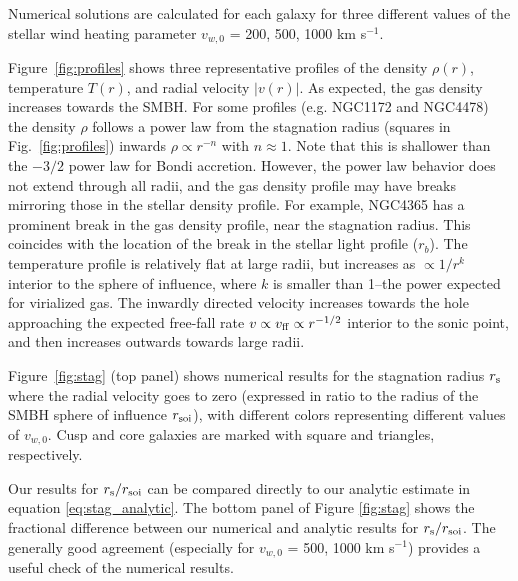 \documentclass[usenatbib,fleqn]{mn2e}
\newcommand{\rb}{r_b}
\begin{document}
Numerical solutions are calculated for each galaxy for three different values of the stellar wind heating parameter $v_{w,0}$ = 200, 500, 1000 km s$^{-1}$.  

Figure~\ref{fig:profiles} shows three representative profiles of the
density $\rho(r)$, temperature $T(r)$, and radial velocity $|v(r)|$.
As expected, the gas density increases towards the SMBH.  For some
profiles (e.g. NGC1172 and NGC4478) the density $\rho$ follows a power
law from the stagnation radius (squares in Fig.~\ref{fig:profiles})
inwards $\rho \propto r^{-n}$ with $n \approx 1$. Note that this is
shallower than the $-3/2$ power law for Bondi accretion. However, the
power law behavior does not extend through all radii, and the gas
density profile may have breaks mirroring those in the stellar density
profile. For example, NGC4365 has a prominent break in the gas density
profile, near the stagnation radius. This coincides with the location
of the break in the stellar light profile ($\rb$). The temperature
profile is relatively flat at large radii, but increases as $\propto
1/r^{k}$ interior to the sphere of influence, where $k$ is smaller
than 1--the power expected for virialized gas.  The inwardly directed
velocity increases towards the hole approaching the expected free-fall
rate $v \propto v_{\rm ff}\propto r^{-1/2}$ interior to the sonic
point, and then increases outwards towards large radii.

Figure~\ref{fig:stag} (top panel) shows numerical results for the stagnation radius $r_{\rm s}$ where the radial velocity goes to zero (expressed in ratio to the radius of the SMBH sphere of influence $r_{\rm soi}$), with different colors representing different values of $v_{w,0}$.  Cusp and core galaxies are marked with square and triangles, respectively.  

Our results for $r_{\rm s}/r_{\rm soi}$ can be compared directly to our analytic estimate in equation \ref{eq:stag_analytic}.  The bottom panel of Figure \ref{fig:stag} shows the fractional difference between our numerical and analytic results for $r_{\rm s}/r_{\rm soi}$.  The generally good agreement (especially for $v_{w,0}$ = 500, 1000 km s$^{-1}$) provides a useful check of the numerical results.
\end{document}
